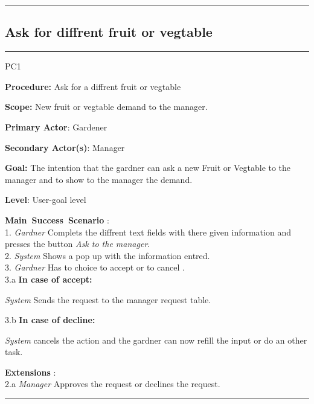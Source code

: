 \hrule
\vspace{0.5cm}

\break

\subsection{Ask for diffrent fruit or vegtable}

\vspace{0.5cm}
\hrule
\hfill \break
\begin{lyxlist}{PC1}
\small{
\item [\textbf{Procedure:}] Ask for a diffrent fruit or vegtable
\item [\textbf{Scope:}] New fruit or vegtable demand to the manager.
\item [\textbf{Primary Actor}:] Gardener
\item [\textbf{Secondary Actor(s)}:] Manager
\item [\textbf{Goal:}] The intention that the gardner can ask a new Fruit or
Vegtable to the manager and to show to the manager the demand.
\item [\textbf{Level}:] User-goal level
\item [\textbf{Main~Success~Scenario}]:\\
1. \emph{Gardner} Complets the diffrent text fields with there given
information and presses the button \emph{Ask to the manager}. \\
2. \emph{System} Shows a pop up with the information entred.\\
3. \emph{Gardner} Has to choice to accept or to cancel .\\
	3.a \textbf{In case of accept:}
		\begin{Tab}{2em} \emph{System} Sends the request to the manager
		request table.\end{Tab}
	3.b \textbf{In case of decline:}
		\begin{Tab}{2em} \emph{System} cancels the action and the gardner can
		now refill the input or do an other task. \end{Tab}
\item [\textbf{Extensions}]:\\
2.a  \emph{Manager} Approves the request or declines the request.\\
}
\end{lyxlist}
\hrule
\vspace{0.5cm}








